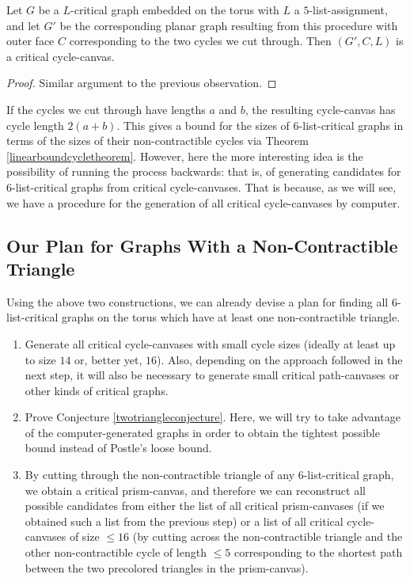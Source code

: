 \begin{observation}
Let $G$ be a $L$-critical graph embedded on the torus with $L$ a $5$-list-assignment,
and let $G'$ be the corresponding planar graph resulting from this procedure with outer face $C$
corresponding to the two cycles we cut through. Then $(G', C, L)$ is a critical cycle-canvas.
\end{observation}

\begin{proof}
Similar argument to the previous observation.
\end{proof}

If the cycles we cut through have lengths $a$ and $b$, the resulting cycle-canvas has cycle length
$2(a+b)$. This gives a bound for the sizes of $6$-list-critical graphs in terms of the sizes of 
their non-contractible cycles via Theorem \ref{linearboundcycletheorem}. However, here the more
interesting idea is the possibility of running the process backwards: that is, of generating
candidates for $6$-list-critical graphs from critical cycle-canvases. 
That is because, as we will see, we have a procedure for the generation of all critical
cycle-canvases by computer. 


\subsection{Our Plan for Graphs With a Non-Contractible Triangle}



Using the above two constructions, we can already devise a plan for finding all $6$-list-critical 
graphs on the torus which have at least one non-contractible triangle.

\begin{enumerate}
	\item Generate all critical cycle-canvases with small cycle sizes (ideally at least up to 
	size $14$ or, better yet, $16$). Also, depending on the approach followed in the next step, it will also be 
	necessary to generate small critical path-canvases or other kinds of critical graphs. 
	\item Prove Conjecture \ref{twotriangleconjecture}. Here, we will try to take advantage
	of the computer-generated graphs in order to obtain the tightest possible bound instead of
	Postle's loose bound.
	\item By cutting through the non-contractible triangle of any $6$-list-critical graph, we
	obtain a critical prism-canvas, and therefore we can reconstruct all possible candidates
	from either the list of all critical prism-canvases (if we obtained such a list from the
	previous step) or a list of all critical cycle-canvases of size $\leq 16$ (by cutting 
	across the non-contractible triangle and the other non-contractible cycle of length 
	$\leq 5$ corresponding to the shortest path between the two precolored triangles in the
	prism-canvas).
\end{enumerate}

